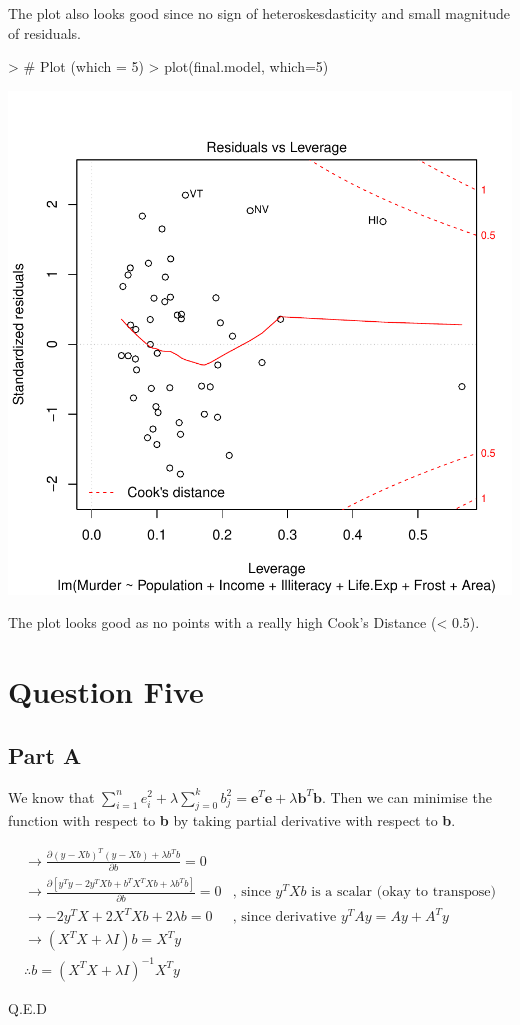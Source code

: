 \documentclass{article}
\begin{document}
\noindent The plot also looks good since no sign of heteroskesdasticity and small magnitude of residuals.

\begin{Schunk}
\begin{Sinput}
> # Plot (which = 5)
> plot(final.model, which=5)
\end{Sinput}
\end{Schunk}
\includegraphics{Assignment2-018}

\noindent The plot looks good as no points with a really high Cook's Distance (< 0.5).

\section{Question Five}
\subsection{Part A}
We know that $\sum_{i=1}^ne_i^2 + \lambda\sum_{j=0}^kb_j^2 = \textbf{e}^T\textbf{e} + \lambda \textbf{b}^T\textbf{b}$. Then we can minimise the function with respect to \textbf{b} by taking partial derivative with respect to \textbf{b}.

\begin{align*}
  \rightarrow \frac{\partial (y-Xb)^T(y-Xb) + \lambda b^Tb}{\partial b} = 0 \\
  \rightarrow \frac{\partial[y^Ty - 2y^TXb + b^TX^TXb + \lambda b^Tb]}{\partial b} = 0 & \text{, since $y^TXb$ is a scalar (okay to transpose)} \\
  \rightarrow -2y^TX + 2X^TXb + 2\lambda b = 0 & \text{, since derivative $y^TAy = Ay + A^Ty$}\\
  \rightarrow (X^TX + \lambda I)b = X^Ty  \\
  \therefore b = (X^TX + \lambda I)^{-1}X^Ty
\end{align*}
\begin{flushright}
Q.E.D
\end{flushright}
\end{document}
